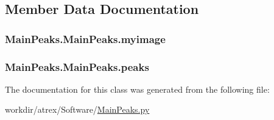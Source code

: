 \subsection{Member Data Documentation}
\hypertarget{class_main_peaks_1_1_main_peaks_a3154ab9972004f57fe2e423781f07452}{
\subsubsection[{myimage}]{\setlength{\rightskip}{0pt plus 5cm}Main\-Peaks.\-Main\-Peaks.\-myimage}}\label{class_main_peaks_1_1_main_peaks_a3154ab9972004f57fe2e423781f07452}
\hypertarget{class_main_peaks_1_1_main_peaks_a5c32a36556e49ae19ef9434048cc4a42}{
\subsubsection[{peaks}]{\setlength{\rightskip}{0pt plus 5cm}Main\-Peaks.\-Main\-Peaks.\-peaks}}\label{class_main_peaks_1_1_main_peaks_a5c32a36556e49ae19ef9434048cc4a42}


The documentation for this class was generated from the following file\-:\begin{DoxyCompactItemize}
\item 
workdir/atrex/\-Software/\hyperlink{_main_peaks_8py}{Main\-Peaks.\-py}\end{DoxyCompactItemize}
